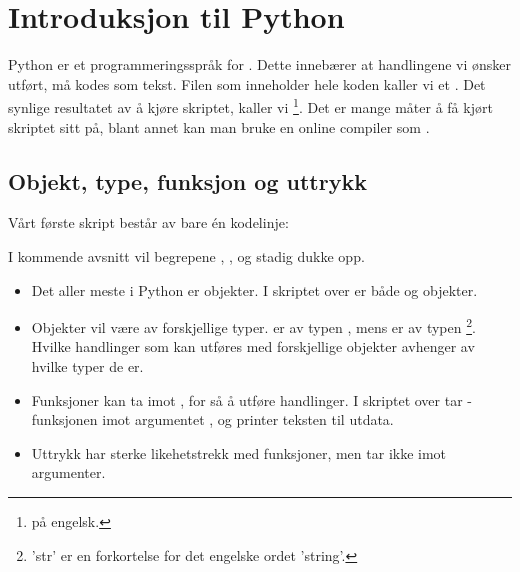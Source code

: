 



\addto\captionsenglish{\renewcommand{\contentsname}{Innhold}}

\tableofcontents
\section{Introduksjon til Python}
Python er et programmeringsspråk for . Dette innebærer at handlingene vi ønsker utført, må kodes som tekst. Filen som inneholder hele koden kaller vi et . Det synlige resultatet av å kjøre skriptet, kaller vi \footnote{ på engelsk.}. Det er mange måter å få kjørt skriptet sitt på, blant annet kan man bruke en online compiler som .
\subsection{Objekt, type, funksjon og uttrykk}
Vårt første skript består av bare én kodelinje:


I kommende avsnitt vil begrepene , ,  og  stadig dukke opp.
\begin{itemize}
	\item Det aller meste i Python er objekter. I skriptet over er både  og  objekter.
	\item Objekter vil være av forskjellige typer.  er av typen , mens  er av typen \footnote{'str' er en forkortelse for det engelske ordet 'string'.}. Hvilke handlinger som kan utføres med forskjellige objekter avhenger av hvilke typer de er.
	\item Funksjoner kan ta imot , for så å utføre handlinger. I skriptet over tar -funksjonen imot argumentet , og printer teksten til utdata.
	\item Uttrykk har sterke likehetstrekk med funksjoner, men tar ikke imot argumenter.
\end{itemize}
\newpage
